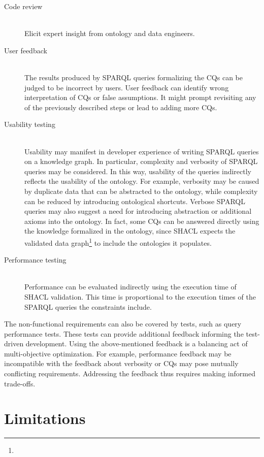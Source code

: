 \documentclass[
]{ceurart}
\begin{document}
\begin{description}
    \item[Code review] \hfill \\
    Elicit expert insight from ontology and data engineers.
    \item[User feedback] \hfill \\
    The results produced by SPARQL queries formalizing the CQs can be judged to be incorrect by users. User feedback can identify wrong interpretation of CQs or false assumptions. It might prompt revisiting any of the previously described steps or lead to adding more CQs.
    \item[Usability testing] \hfill \\
    Usability may manifest in developer experience of writing SPARQL queries on a knowledge graph. In particular, complexity and verbosity of SPARQL queries may be considered. In this way, usability of the queries indirectly reflects the usability of the ontology. For example, verbosity may be caused by duplicate data that can be abstracted to the ontology, while complexity can be reduced by introducing ontological shortcuts. Verbose SPARQL queries may also suggest a need for introducing abstraction or additional axioms into the ontology. In fact, some CQs can be answered directly using the knowledge formalized in the ontology, since SHACL expects the validated data graph\footnote{\urlschaclgraphdata} to include the ontologies it populates.
    \item[Performance testing] \hfill \\
    Performance can be evaluated indirectly using the execution time of SHACL validation. This time is proportional to the execution times of the SPARQL queries the constraints include.
\end{description}

The non-functional requirements can also be covered by tests, such as query performance tests. These tests can provide additional feedback informing the test-driven development. Using the above-mentioned feedback is a balancing act of multi-objective optimization. For example, performance feedback may be incompatible with the feedback about verbosity or CQs may pose mutually conflicting requirements. Addressing the feedback thus requires making informed trade-offs.

\section{Limitations}
\end{document}
